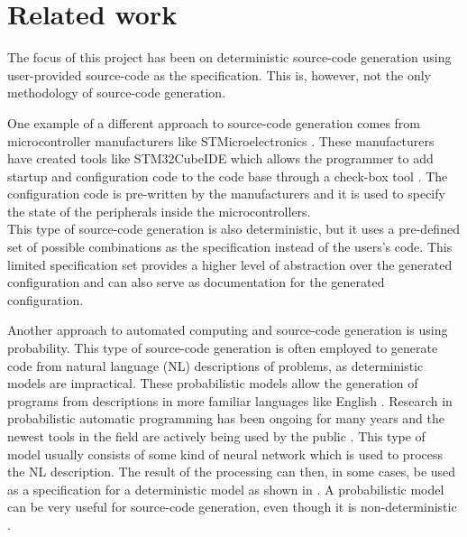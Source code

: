 \chapter{Related work}

The focus of this project has been on deterministic source-code generation using user-provided source-code as the specification. This is, however, not the only methodology of source-code generation. 

One example of a different approach to source-code generation comes from microcontroller manufacturers like STMicroelectronics \cite{STMicroelectronicsOurTechnology}. These manufacturers have created tools like STM32CubeIDE which allows the programmer to add startup and configuration code to the code base through a check-box tool \cite{STM32CubeDevelopmentSoftware}. The configuration code is pre-written by the manufacturers and it is used to specify the state of the peripherals inside the microcontrollers. \\
This type of source-code generation is also deterministic, but it uses a pre-defined set of possible combinations as the specification instead of the users's code. This limited specification set provides a higher level of abstraction over the generated configuration and can also serve as documentation for the generated configuration. 


Another approach to automated computing and source-code generation is using probability. 
This type of source-code generation is often employed to generate code from natural language (NL) descriptions of problems, as deterministic models are impractical. 
These probabilistic models allow the generation of programs from descriptions in more familiar languages like English \cite{alonStructuralLanguageModels2020}.
Research in probabilistic automatic programming has been ongoing for many years and the newest tools in the field are actively being used by the public \cite{WhatChatGPTWhy, johnmaedaChoosingLLMModel2023}.
This type of model usually consists of some kind of neural network which is used to process the NL description. 
The result of the processing can then, in some cases, be used as a specification for a deterministic model as shown in \cite{yinSyntacticNeuralModel2017}. 
A probabilistic model can be very useful for source-code generation, even though it is non-deterministic \cite{chenEvaluatingLargeLanguage2021}.
